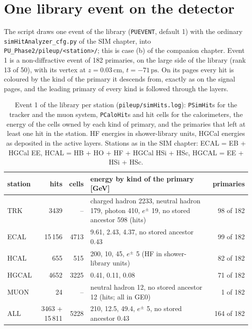 \documentclass[11pt,a4paper]{article}
\newcommand{\code}[1]{\texttt{#1}}
\newcommand{\ps}{\,\mathrm{ps}}
\newcommand{\cm}{\,\mathrm{cm}}
\begin{document}
\FloatBarrier
\section{One library event on the detector}
\label{sec:oneevent}

{\sloppy The script draws one event of the library (\code{PUEVENT}, default 1) with the ordinary
\code{simHitAnalyzer\_cfg.py} of the SIM chapter, into \code{PU\_Phase2/pileup/<station>/}; this is case (b)
of the companion chapter. Event 1 is a non-diffractive event of 182 primaries, on the large side of the
library (rank 13 of 50), with its vertex at $z=0.03\cm$, $t=-71\ps$. On its pages every hit is coloured by
the kind of the primary it descends from, exactly as on the signal pages, and the leading primary of every
kind is followed through the layers.\par}

\begin{table}[H]
\centering\small
\caption{Event 1 of the library per station (\code{pileup/simHits.log}): \code{PSimHit}s for the tracker and
the muon system, \code{PCaloHit}s and hit cells for the calorimeters, the energy of the cells owned by
each kind of primary, and the primaries that left at least one hit in the station. HF energies in
shower-library units, HGCal energies as deposited in the active layers. Stations as in the SIM chapter:
ECAL = EB + HGCal EE, HCAL = HB + HO + HF + HGCal HSi + HSc, HGCAL = EE + HSi + HSc.}
\label{tab:stations}
\setlength{\tabcolsep}{4pt}
\begin{tabularx}{\textwidth}{lrrXr}
\toprule
station & hits & cells & energy by kind of the primary [GeV] & primaries \\
\midrule
TRK & 3439 & -- & \textcolor{sigchg}{charged hadron} 2233, \textcolor{signeu}{neutral hadron} 179, \textcolor{sigpho}{photon} 410, $e^\pm$ 19, no stored ancestor 598 (hits) & 98 of 182 \\
ECAL & 15\,156 & 4713 & \textcolor{sigchg}{9.61}, \textcolor{signeu}{2.43}, \textcolor{sigpho}{4.37}, no stored ancestor 0.43 & 99 of 182 \\
HCAL & 655 & 515 & \textcolor{sigchg}{200}, \textcolor{signeu}{10}, \textcolor{sigpho}{45}, $e^\pm$ 5 (HF in shower-library units) & 82 of 182 \\
HGCAL & 4652 & 3225 & \textcolor{sigchg}{0.41}, \textcolor{signeu}{0.11}, \textcolor{sigpho}{0.08} & 71 of 182 \\
MUON & 24 & -- & \textcolor{signeu}{neutral hadron} 12, no stored ancestor 12 (hits; all in GE0) & 1 of 182 \\
ALL & 3463 + 15\,811 & 5228 & \textcolor{sigchg}{210}, \textcolor{signeu}{12.5}, \textcolor{sigpho}{49.4}, $e^\pm$ 5, no stored ancestor 0.43 & 164 of 182 \\
\bottomrule
\end{tabularx}
\end{table}
\end{document}
